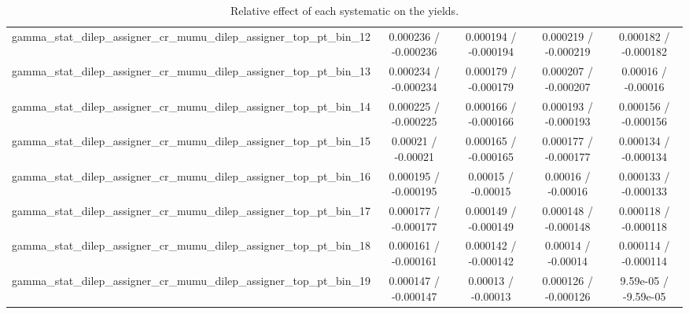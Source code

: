 \documentclass[10pt]{article}
\begin{document}
\begin{table}[htbp]
\begin{center}
\begin{tabular}{|c|c|c|c|c|}
  gamma_stat_dilep_assigner_cr_mumu_dilep_assigner_top_pt_bin_12 & 0.000236 / -0.000236 & 0.000194 / -0.000194 & 0.000219 / -0.000219 & 0.000182 / -0.000182 \\ 
  gamma_stat_dilep_assigner_cr_mumu_dilep_assigner_top_pt_bin_13 & 0.000234 / -0.000234 & 0.000179 / -0.000179 & 0.000207 / -0.000207 & 0.00016 / -0.00016 \\ 
  gamma_stat_dilep_assigner_cr_mumu_dilep_assigner_top_pt_bin_14 & 0.000225 / -0.000225 & 0.000166 / -0.000166 & 0.000193 / -0.000193 & 0.000156 / -0.000156 \\ 
  gamma_stat_dilep_assigner_cr_mumu_dilep_assigner_top_pt_bin_15 & 0.00021 / -0.00021 & 0.000165 / -0.000165 & 0.000177 / -0.000177 & 0.000134 / -0.000134 \\ 
  gamma_stat_dilep_assigner_cr_mumu_dilep_assigner_top_pt_bin_16 & 0.000195 / -0.000195 & 0.00015 / -0.00015 & 0.00016 / -0.00016 & 0.000133 / -0.000133 \\ 
  gamma_stat_dilep_assigner_cr_mumu_dilep_assigner_top_pt_bin_17 & 0.000177 / -0.000177 & 0.000149 / -0.000149 & 0.000148 / -0.000148 & 0.000118 / -0.000118 \\ 
  gamma_stat_dilep_assigner_cr_mumu_dilep_assigner_top_pt_bin_18 & 0.000161 / -0.000161 & 0.000142 / -0.000142 & 0.00014 / -0.00014 & 0.000114 / -0.000114 \\ 
  gamma_stat_dilep_assigner_cr_mumu_dilep_assigner_top_pt_bin_19 & 0.000147 / -0.000147 & 0.00013 / -0.00013 & 0.000126 / -0.000126 & 9.59e-05 / -9.59e-05 \\ 
\hline 
\end{tabular} 
\caption{Relative effect of each systematic on the yields.} 
\end{center} 
\end{table} 
\end{document}

